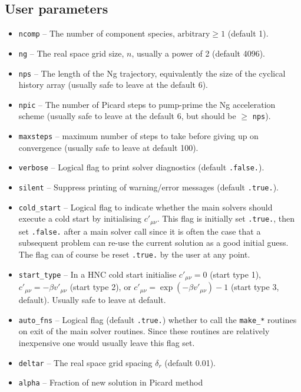 \documentclass[12pt,a4paper]{article}
\begin{document}
\subsection{User parameters}
%
\begin{itemize}
%
\item\verb+ncomp+ -- The number of component species, $\text{arbitrary}\ge
  1$ (default 1).
%
\item\verb+ng+ -- The real space grid size, $n$, usually a power of 2
  (default 4096).
%
\item\verb+nps+ -- The length of the Ng trajectory, equivalently the
  size of the cyclical history array (usually safe to leave at the
  default 6).
%
\item\verb+npic+ -- The number of Picard steps to pump-prime the Ng
  acceleration scheme (usually safe to leave at the default 6, but
  should be $\ge$ \verb+nps+).
%
\item\verb+maxsteps+ -- maximum number of steps to take before giving up on
convergence (usually safe to leave at default 100).
%
\item\verb+verbose+ -- Logical flag to print solver diagnostics (default
  \verb+.false.+).
%
\item\verb+silent+ -- Suppress printing of warning/error messages
  (default \verb+.true.+).
%
\item\verb+cold_start+ -- Logical flag to indicate whether the main
  solvers should execute a cold start by initialising $c'_{\mu\nu}$.
  This flag is initially set \verb+.true.+, then set \verb+.false.+
  after a main solver call since it is often the case that a
  subsequent problem can re-use the current solution as a good initial
  guess.  The flag can of course be reset \verb+.true.+ by the user at
  any point.
%
\item\verb+start_type+ -- In a HNC cold start initialise
  $c'_{\mu\nu}=0$ (start type 1), $c'_{\mu\nu}=-\beta v'_{\mu\nu}$
  (start type 2), or $c'_{\mu\nu}=\exp(-\beta v'_{\mu\nu})-1$ (start
  type 3, default).  Usually safe to leave at default.
%
\item\verb+auto_fns+ -- Logical flag (default \verb+.true.+) whether
  to call the \verb+make_*+ routines on exit of the main solver
  routines.  Since these routines are relatively inexpensive one would
  usually leave this flag set.
%
\item\verb+deltar+ -- The real space grid spacing $\delta_r$ (default 0.01).
%
\item\verb+alpha+ -- Fraction of new solution in Picard method

\end{itemize}
\end{document}
